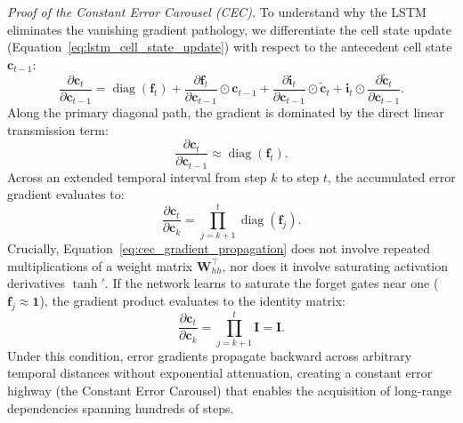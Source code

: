 \documentclass[../../../main.tex]{subfiles}
\begin{document}
\textit{Proof of the Constant Error Carousel (CEC).} To understand why the LSTM eliminates the vanishing gradient pathology, we differentiate the cell state update (Equation~\ref{eq:lstm_cell_state_update}) with respect to the antecedent cell state $\mathbf{c}_{t-1}$:
\begin{equation}
\frac{\partial \mathbf{c}_t}{\partial \mathbf{c}_{t-1}} = \operatorname{diag}\left(\mathbf{f}_t\right) + \frac{\partial \mathbf{f}_t}{\partial \mathbf{c}_{t-1}} \odot \mathbf{c}_{t-1} + \frac{\partial \mathbf{i}_t}{\partial \mathbf{c}_{t-1}} \odot \tilde{\mathbf{c}}_t + \mathbf{i}_t \odot \frac{\partial \tilde{\mathbf{c}}_t}{\partial \mathbf{c}_{t-1}}.
\end{equation}
Along the primary diagonal path, the gradient is dominated by the direct linear transmission term:
\begin{equation}
\frac{\partial \mathbf{c}_t}{\partial \mathbf{c}_{t-1}} \approx \operatorname{diag}\left(\mathbf{f}_t\right).
\end{equation}
Across an extended temporal interval from step $k$ to step $t$, the accumulated error gradient evaluates to:
\begin{equation}
\frac{\partial \mathbf{c}_t}{\partial \mathbf{c}_k} = \prod_{j=k+1}^t \operatorname{diag}\left(\mathbf{f}_j\right).
\label{eq:cec_gradient_propagation}
\end{equation}
Crucially, Equation~\ref{eq:cec_gradient_propagation} does not involve repeated multiplications of a weight matrix $\mathbf{W}_{hh}^\top$, nor does it involve saturating activation derivatives $\tanh'$. If the network learns to saturate the forget gates near one ($\mathbf{f}_j \approx \mathbf{1}$), the gradient product evaluates to the identity matrix:
\begin{equation}
\frac{\partial \mathbf{c}_t}{\partial \mathbf{c}_k} = \prod_{j=k+1}^t \mathbf{I} = \mathbf{I}.
\end{equation}
Under this condition, error gradients propagate backward across arbitrary temporal distances without exponential attenuation, creating a constant error highway (the Constant Error Carousel) that enables the acquisition of long-range dependencies spanning hundreds of steps.
\end{document}

